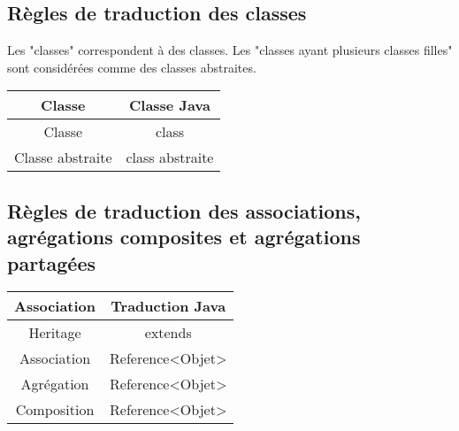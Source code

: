     \subsection{Règles de traduction des classes}
    
    Les "classes" correspondent à des classes.
    Les "classes ayant plusieurs classes filles" sont considérées comme des classes abstraites.
    
        \begin{center}
        \begin{tabular}{|c|c|}
            \hline
            Classe & Classe Java\\
            \hline
            Classe & class \\
            Classe abstraite & class abstraite \\
            \hline
        \end{tabular}
    \end{center}
    
    
    
    \subsection{Règles de traduction des associations, agrégations composites et agrégations partagées}
    
    \begin{center}
        \begin{tabular}{|c|c|}
            \hline
            Association & Traduction Java\\
            \hline
            Heritage & extends \\
            Association & Reference<Objet> \\
            Agrégation & Reference<Objet> \\
            Composition & Reference<Objet>\\
            \hline
        \end{tabular}
    \end{center}
    
